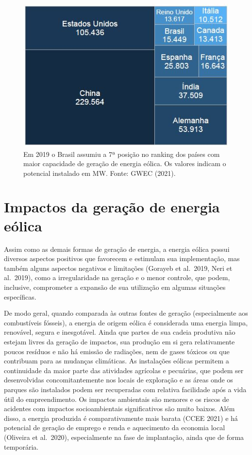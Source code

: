 \documentclass[
  oneside]{scrbook}
\begin{document}
\begin{figure}[H]

{\centering \includegraphics[width=0.6\linewidth]{imagens/cap01/Figura_1.7} 

}

\caption{Em 2019 o Brasil assumiu a 7ª posição no ranking dos países com maior capacidade de geração de energia eólica. Os valores indicam o potencial instalado em MW. Fonte: GWEC (2021).}\label{fig:07}
\end{figure}

\hypertarget{impactos-da-gerauxe7uxe3o-de-energia-euxf3lica}{%
\section{Impactos da geração de energia eólica}\label{impactos-da-gerauxe7uxe3o-de-energia-euxf3lica}}

Assim como as demais formas de geração de energia, a energia eólica possui diversos aspectos positivos que favorecem e estimulam sua implementação, mas também alguns aspectos negativos e limitações (Gorayeb et al.~2019, Neri et al.~2019), como a irregularidade na geração e o menor controle, que podem, inclusive, comprometer a expansão de sua utilização em algumas situações específicas.

De modo geral, quando comparada às outras fontes de geração (especialmente aos combustíveis fósseis), a energia de origem eólica é considerada uma energia limpa, renovável, segura e inesgotável. Ainda que partes de sua cadeia produtiva não estejam livres da geração de impactos, sua produção em si gera relativamente poucos resíduos e não há emissão de radiações, nem de gases tóxicos ou que contribuam para as mudanças climáticas. As instalações eólicas permitem a continuidade da maior parte das atividades agrícolas e pecuárias, que podem ser desenvolvidas concomitantemente nos locais de exploração e as áreas onde os parques são instalados podem ser recuperadas com relativa facilidade após a vida útil do empreendimento. Os impactos ambientais são menores e os riscos de acidentes com impactos socioambientais significativos são muito baixos. Além disso, a energia produzida é comparativamente mais barata (CCEE 2021) e há potencial de geração de emprego e renda e aquecimento da economia local (Oliveira et al.~2020), especialmente na fase de implantação, ainda que de forma temporária.
\end{document}
